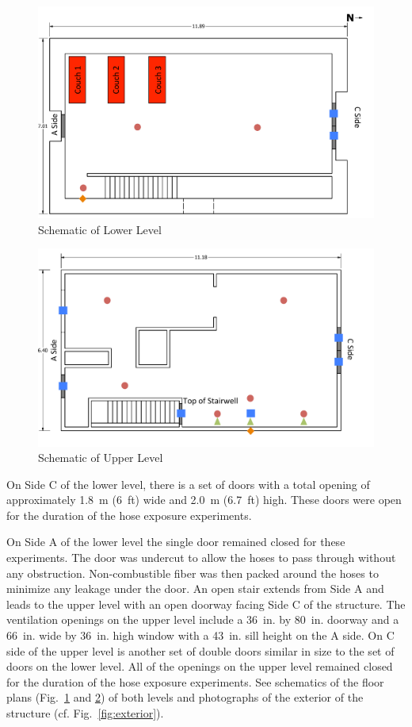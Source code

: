 \documentclass[letterpaper,11pt]{texMemo} %
\begin{document}
\begin{figure}[!ht]
\centering
\includegraphics[width=0.8\columnwidth]{../Figures/Hose_Figures/schematic_lower}
\caption{Schematic of Lower Level}
\label{fig:schematic_low}
\end{figure}

\begin{figure}[!ht]
\centering
\includegraphics[width=0.8\columnwidth]{../Figures/Hose_Figures/schematic_upper}
\caption{Schematic of Upper Level}
\label{fig:schematic_up}
\end{figure}

On Side C of the lower level, there is a set of doors with a total opening of approximately 1.8~m (6~ft) wide and 2.0~m (6.7~ft) high. These doors were open for the duration of the hose exposure experiments.  

On Side A of the lower level the single door remained closed for these experiments. The door was undercut to allow the hoses to pass through without any obstruction. Non-combustible fiber was then packed around the hoses to minimize any leakage under the door.  An open stair extends from Side A and leads to the upper level with an open doorway facing Side C of the structure. The ventilation openings on the upper level include a 36~in. by 80~in. doorway and a 66~in. wide by 36~in. high window with a 43~in. sill height on the A side. On C side of the upper level is another set of double doors similar in size to the set of doors on the lower level. All of the openings on the upper level remained closed for the duration of the hose exposure experiments. See schematics of the floor plans (Fig.~\ref{fig:schematic_low} and \ref{fig:schematic_up}) of both levels and photographs of the exterior of the structure (cf. Fig.~\ref{fig:exterior}).
\end{document}
